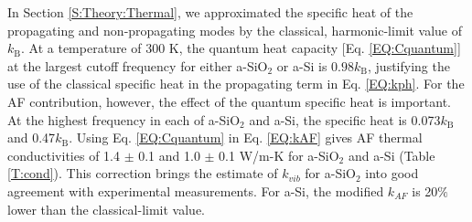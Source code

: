 \documentclass[aps,prb,onecolumn,preprint,superscriptaddress,footinbib,amsmath,amssymb,floatfix]{revtex4}
\begin{document}
In Section \ref{S:Theory:Thermal}, we approximated the specific heat 
of the propagating 
and non-propagating modes by the classical, harmonic-limit 
value of $k_{\text{B}}$. At a temperature of $300$ K, the quantum 
heat capacity [Eq. \eqref{EQ:Cquantum}] 
at the largest cutoff frequency for either a-SiO$_2$ or a-Si 
is $0.98 k_{\text{B}}$, justifying the 
use of the classical specific heat in the propagating term 
in Eq. \eqref{EQ:kph}. For the AF contribution, however, the 
effect of the quantum specific heat is important. At the highest 
frequency in each of a-SiO$_2$ and a-Si, the specific heat is 
0.073$k_{\text{B}}$ and 0.47$k_{\text{B}}$. 
Using Eq. \eqref{EQ:Cquantum} 
in Eq. \eqref{EQ:kAF} gives AF thermal conductivities of 
1.4 $\pm$ 0.1 and 
1.0 $\pm$ 0.1 W/m-K for a-SiO$_2$ and a-Si (Table \ref{T:cond}). 
This correction brings the estimate of $k_{vib}$ for 
a-SiO$_2$ into good agreement with experimental measurements.
\cite{cahill_lattice_1988,lee_heat_1997,
yamane_measurement_2002,regner_broadband_2013} 
For a-Si, the modified $k_{AF}$ is 20$\%$ lower than the 
classical-limit value. 
\end{document}

